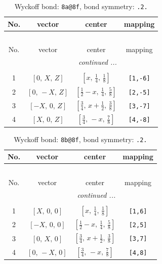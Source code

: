 \documentclass[fleqn,8pt]{jsarticle}
\begin{document}
\begin{longtable}{cccc}
\caption{Wyckoff bond: {\tt 8a@8f}, bond symmetry: {\tt .2.}}
 \\
 \hline \hline
No. & vector & center & mapping \\ \hline \endfirsthead

\multicolumn{3}{l}{\tablename\ \thetable{}} \\
 \hline \hline
No. & vector & center & mapping \\ \hline \endhead

 \hline \hline
\multicolumn{3}{r}{\footnotesize\it continued ...} \\ \endfoot

 \hline \hline
\multicolumn{3}{r}{} \\ \endlastfoot

1 & $\left[ 0,\, X,\, Z \right]$ & $\left[ x,\, \frac{1}{4},\, \frac{1}{8} \right]$ & {\tt [1,-6]} \\ \hline
2 & $\left[ 0,\, - X,\, Z \right]$ & $\left[ \frac{1}{2} - x,\, \frac{1}{4},\, \frac{5}{8} \right]$ & {\tt [2,-5]} \\ \hline
3 & $\left[ - X,\, 0,\, Z \right]$ & $\left[ \frac{3}{4},\, x + \frac{1}{2},\, \frac{3}{8} \right]$ & {\tt [3,-7]} \\ \hline
4 & $\left[ X,\, 0,\, Z \right]$ & $\left[ \frac{3}{4},\, - x,\, \frac{7}{8} \right]$ & {\tt [4,-8]} \\
\end{longtable}
\renewcommand{\arraystretch}{1.2}
\begin{longtable}{cccc}
\caption{Wyckoff bond: {\tt 8b@8f}, bond symmetry: {\tt .2.}}
 \\
 \hline \hline
No. & vector & center & mapping \\ \hline \endfirsthead

\multicolumn{3}{l}{\tablename\ \thetable{}} \\
 \hline \hline
No. & vector & center & mapping \\ \hline \endhead

 \hline \hline
\multicolumn{3}{r}{\footnotesize\it continued ...} \\ \endfoot

 \hline \hline
\multicolumn{3}{r}{} \\ \endlastfoot

1 & $\left[ X,\, 0,\, 0 \right]$ & $\left[ x,\, \frac{1}{4},\, \frac{1}{8} \right]$ & {\tt [1,6]} \\ \hline
2 & $\left[ - X,\, 0,\, 0 \right]$ & $\left[ \frac{1}{2} - x,\, \frac{1}{4},\, \frac{5}{8} \right]$ & {\tt [2,5]} \\ \hline
3 & $\left[ 0,\, X,\, 0 \right]$ & $\left[ \frac{3}{4},\, x + \frac{1}{2},\, \frac{3}{8} \right]$ & {\tt [3,7]} \\ \hline
4 & $\left[ 0,\, - X,\, 0 \right]$ & $\left[ \frac{3}{4},\, - x,\, \frac{7}{8} \right]$ & {\tt [4,8]} \\
\end{longtable}
\end{document}
